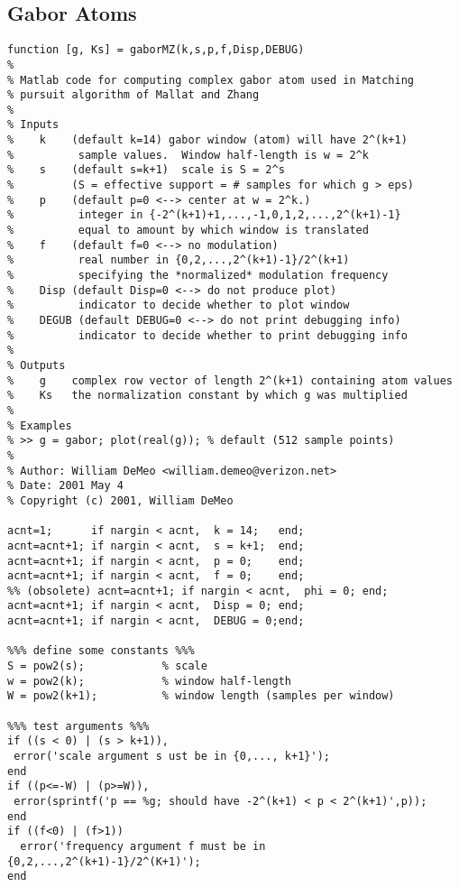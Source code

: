 \subsection{Gabor Atoms}\label{sec:gaborMZ}
\begin{verbatim}
function [g, Ks] = gaborMZ(k,s,p,f,Disp,DEBUG)
%
% Matlab code for computing complex gabor atom used in Matching
% pursuit algorithm of Mallat and Zhang
%
% Inputs
%    k    (default k=14) gabor window (atom) will have 2^(k+1) 
%          sample values.  Window half-length is w = 2^k
%    s    (default s=k+1)  scale is S = 2^s 
%         (S = effective support = # samples for which g > eps)
%    p    (default p=0 <--> center at w = 2^k.)
%          integer in {-2^(k+1)+1,...,-1,0,1,2,...,2^(k+1)-1} 
%          equal to amount by which window is translated
%    f    (default f=0 <--> no modulation)
%          real number in {0,2,...,2^(k+1)-1}/2^(k+1)
%          specifying the *normalized* modulation frequency
%    Disp (default Disp=0 <--> do not produce plot)
%          indicator to decide whether to plot window 
%    DEGUB (default DEBUG=0 <--> do not print debugging info)
%          indicator to decide whether to print debugging info
%
% Outputs
%    g    complex row vector of length 2^(k+1) containing atom values
%    Ks   the normalization constant by which g was multiplied
%
% Examples
% >> g = gabor; plot(real(g)); % default (512 sample points)
%
% Author: William DeMeo <william.demeo@verizon.net>
% Date: 2001 May 4
% Copyright (c) 2001, William DeMeo

acnt=1;      if nargin < acnt,  k = 14;   end;
acnt=acnt+1; if nargin < acnt,  s = k+1;  end;
acnt=acnt+1; if nargin < acnt,  p = 0;    end;
acnt=acnt+1; if nargin < acnt,  f = 0;    end;
%% (obsolete) acnt=acnt+1; if nargin < acnt,  phi = 0; end;
acnt=acnt+1; if nargin < acnt,  Disp = 0; end;
acnt=acnt+1; if nargin < acnt,  DEBUG = 0;end;

%%% define some constants %%%
S = pow2(s);            % scale
w = pow2(k);            % window half-length
W = pow2(k+1);          % window length (samples per window)

%%% test arguments %%%
if ((s < 0) | (s > k+1)),
 error('scale argument s ust be in {0,..., k+1}');
end
if ((p<=-W) | (p>=W)),
 error(sprintf('p == %g; should have -2^(k+1) < p < 2^(k+1)',p));
end
if ((f<0) | (f>1))
  error('frequency argument f must be in {0,2,...,2^(k+1)-1}/2^(K+1)');
end


\end{verbatim}
